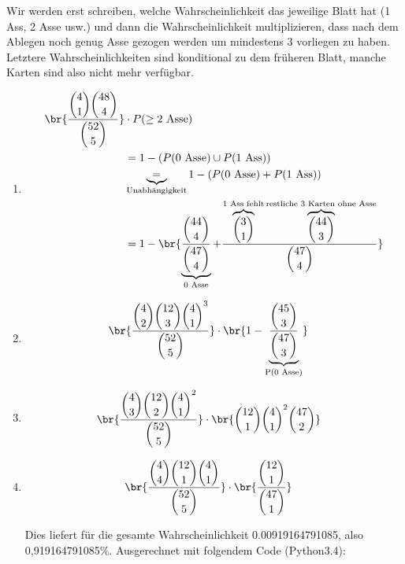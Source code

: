 \begin{enumerate}[a)]
  Wir werden erst schreiben, welche Wahrscheinlichkeit das jeweilige Blatt hat (1 Ass, 2 Asse usw.) und dann die Wahrscheinlichkeit multiplizieren, dass nach dem Ablegen noch genug Asse gezogen werden um mindestens 3 vorliegen zu haben. Letztere Wahrscheinlichkeiten sind konditional zu dem früheren Blatt, manche Karten sind also nicht mehr verfügbar.

  \begin{enumerate}
    \item
      \begin{align*}
        \br{\frac{\dbinom{4}{1} \dbinom{48}{4} }{ \dbinom{52}{5} }} &\cdot P(\geq \text{2 Asse}) \\
                                    &= 1 - (P(\text{0 Asse}) \cup P(\text{1 Ass}))\\
                                    &\underbrace{=}_{\text{Unabhängigkeit}} 1 - (P(\text{0 Asse}) + P(\text{1 Ass}))\\
                                    &= 1- \br{ \underbrace{\frac{\dbinom{44}{4}}{\dbinom{47}{4}}}_{\text{0 Asse}} +
                                        \frac{ \overbrace{\dbinom{3}{1}}^{\text{1 Ass fehlt}} \overbrace{\dbinom{44}{3}}^{\text{restliche 3 Karten ohne Asse}}}{ \dbinom{47}{4} } }\\
      \end{align*}
    \item
      \begin{align*}
        \br{ \frac{ \dbinom{4}{2} \dbinom{12}{3} \dbinom{4}{1}^{3} }{ \dbinom{52}{5} }  }
                &\cdot \br{ 1 - \underbrace{\frac{ \dbinom{45}{3} }{\dbinom{47}{3} }}_{\text{P(0 Asse)}} }
      \end{align*}

    \item
      \begin{align*}
        \br{ \frac{ \dbinom{4}{3} \dbinom{12}{2} \dbinom{4}{1}^{2} }{\dbinom{52}{5}} }
          &\cdot \br{ \dbinom{12}{1} \dbinom{4}{1}^{2}{\dbinom{47}{2}} }
      \end{align*}
    \item
      \begin{align*}
        \br{ \frac{ \dbinom{4}{4} \dbinom{12}{1} \dbinom{4}{1} }{\dbinom{52}{5}} }
            &\cdot \br{\frac{\dbinom{12}{1}}{\dbinom{47}{1}}}
      \end{align*}

    Dies liefert für die gesamte Wahrscheinlichkeit 0.00919164791085, also 0,919164791085\%.
    Ausgerechnet mit folgendem Code (Python3.4):


\end{enumerate}
\end{enumerate}
